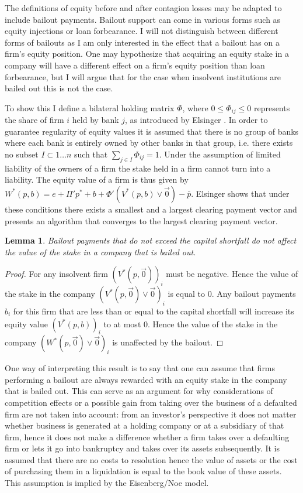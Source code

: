 \documentclass[12pt,a4paper]{article}
\newtheorem{lemma}{Lemma}
\begin{document}
The definitions of equity before and after contagion losses may be adapted to include bailout payments. Bailout support can come in various forms such as equity injections or loan forbearance. I will not distinguish between different forms of bailouts as I am only interested in the effect that a bailout has on a firm’s equity position. One may hypothesize that acquiring an equity stake in a company will have a different effect on a firm’s equity position than loan forbearance, but I will argue that for the case when insolvent institutions are bailed out this is not the case.

To show this I define a bilateral holding matrix $\Phi$, where $0\le \Phi_{ij}\le 0$ represents the share of firm $i$ held by bank $j$, as introduced by Elsinger \cite{Elsinger2009}. In order to guarantee regularity of equity values it is assumed that there is no group of banks where each bank is entirely owned by other banks in that group, i.e. there exists no subset $I\subset{1\dots n}$ such that $\sum_{j\in I} \Phi_{ij} =1$. Under the assumption of limited liability of the owners of a firm the stake held in a firm cannot turn into a liability. The equity value of a firm is thus given by $W^* (p,b)=e+\Pi'p^*+b+\Phi'(V^* (p,b)\vee \vec{0})-\bar{p}$. Elsinger \cite{Elsinger2009} shows that under these conditions there exists a smallest and a largest clearing payment vector and presents an algorithm that converges to the largest clearing payment vector.

\begin{lemma} \label{lem:freebailout}
Bailout payments that do not exceed the capital shortfall do not affect the value of the stake in a company that is bailed out.
\end{lemma}

\begin{proof}
For any insolvent firm $(V^* (p,\vec{0}))_i$ must be negative. Hence the value of the stake in the company $(V^* (p,\vec{0})\vee \vec{0})_i$ is equal to $0$. Any bailout payments $b_i$ for this firm that are less than or equal to the capital shortfall will increase its equity value $(V^* (p,b))_i$ to at most $0$. Hence the value of the stake in the company $(W^* (p,\vec{0}) \vee \vec{0})_i$ is unaffected by the bailout.
\end{proof}

One way of interpreting this result is to say that one can assume that firms performing a bailout are always rewarded with an equity stake in the company that is bailed out. This can serve as an argument for why considerations of competition effects or a possible gain from taking over the business of a defaulted firm are not taken into account: from an investor's perspective it does not matter whether business is generated at a holding company or at a subsidiary of that firm, hence it does not make a difference whether a firm takes over a defaulting firm or lets it go into bankruptcy and takes over its assets subsequently. It is assumed that there are no costs to resolution hence the value of assets or the cost of purchasing them in a liquidation is equal to the book value of these assets. This assumption is implied by the Eisenberg/Noe \cite{Eisenberg2001} model. 
\end{document}
